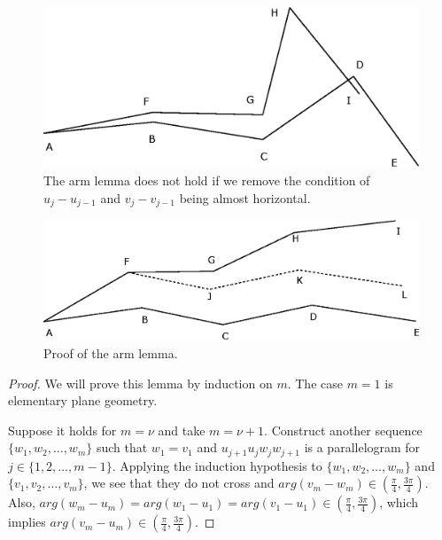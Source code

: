 \documentclass{article}
\theoremstyle{theorem}
\begin{document}
\begin{figure}[h]
\centering
{}
\includegraphics[scale=0.8]{Teto.eps}
\caption{The arm lemma does not hold if we remove the condition of $u_{j }- u_{j-1}$ and $ v_j - v_{j-1} $ being almost horizontal. }\label{Teto}
\end{figure}




\begin{figure}
\centering 
{}
\includegraphics[scale=0.8]{arms.eps}
\caption{Proof of the arm lemma.} \label{arml}
\end{figure}


\begin{proof}
{\rm We will prove this lemma by induction on $m$. The case $m=1$ is elementary plane geometry.


Suppose it holds for $m=\nu$ and take $m = \nu +1$. Construct another sequence $\{ w_1, w_2, \ldots, w_m   \}$ such that $w_1 = v_1$ and $u_{j+1}u_jw_jw_{j+1} $ is a parallelogram for $j \in \{ 1, 2, \ldots , m-1\} $. Applying the induction hypothesis to $\{ w_1, w_2, \ldots , w_m   \}$ and $\{v_1, v_2, \ldots, v_m  \}$, we see that they do not cross and $arg( v_{m} - w_m) \in \left(  \frac{ \pi}{4} , \frac{3\pi}{4}  \right)$. Also, $arg(w_m - u_m )= arg (w_1 - u_1) = arg (v_1 - u_1) \in \left(  \frac{ \pi}{4} , \frac{3\pi}{4}  \right)$, which implies $arg(v_m - u_m)\in \left(  \frac{ \pi}{4} , \frac{3\pi}{4}  \right)$.}
\end{proof}
\end{document}

